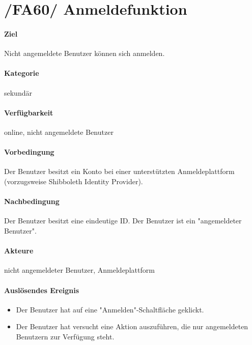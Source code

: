 \section{/FA60/ Anmeldefunktion}
\label{Anmeldefunktion}
\label{/FA60/}
\paragraph{Ziel}
Nicht angemeldete Benutzer können sich anmelden.
\paragraph{Kategorie}
sekundär
\paragraph{Verfügbarkeit}
online, nicht angemeldete Benutzer
\paragraph{Vorbedingung}
Der Benutzer besitzt ein Konto bei einer unterstützten Anmeldeplattform (vorzugsweise Shibboleth Identity Provider).
\paragraph{Nachbedingung}
Der Benutzer besitzt eine eindeutige ID. Der Benutzer ist ein "angemeldeter Benutzer".
\paragraph{Akteure}
nicht angemeldeter Benutzer, Anmeldeplattform
\paragraph{Auslösendes Ereignis}
\begin{itemize}
      \item Der Benutzer hat auf eine "Anmelden"-Schaltfläche geklickt.
      \item Der Benutzer hat versucht eine Aktion auszuführen, die nur angemeldeten Benutzern zur Verfügung steht.
\end{itemize}

